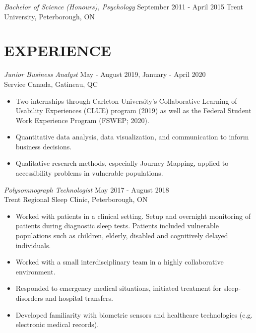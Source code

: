 \documentclass[10pt]{res} %
\begin{document}
\begin{resume}
{\sl Bachelor of Science (Honours), Psychology} \hfill September 2011 - April 2015\newline
Trent University, Peterborough, ON



\section{EXPERIENCE}

{\sl Junior Business Analyst} \hfill May - August 2019, January - April 2020 \\
Service Canada, Gatineau, QC
\begin{itemize}\itemsep -2pt %
    \item Two internships through Carleton University's Collaborative Learning
      of Usability Experiences (CLUE) program (2019) as well as the Federal
      Student Work Experience Program (FSWEP; 2020).
    \item Quantitative data analysis, data visualization, and communication to
      inform business decisions.
    \item Qualitative research methods, especially Journey Mapping, applied to
      accessibility problems in vulnerable populations.
\end{itemize}


{\sl Polysomnograph Technologist} \hfill May 2017 - August 2018 \\
Trent Regional Sleep Clinic, Peterborough, ON
\begin{itemize}\itemsep -2pt %
    \item Worked with patients in a clinical setting. Setup and overnight
      monitoring of patients during diagnostic sleep tests. Patients included
      vulnerable populations such as children, elderly, disabled and
      cognitively delayed individuals.
    \item Worked with a small interdisciplinary team in a highly collaborative
      environment.
    \item Responded to emergency medical situations, initiated treatment for
      sleep-disorders and hospital transfers.
    \item Developed familiarity with biometric sensors and healthcare
      technologies (e.g. electronic medical records).
\end{itemize}


\end{resume}
\end{document}
